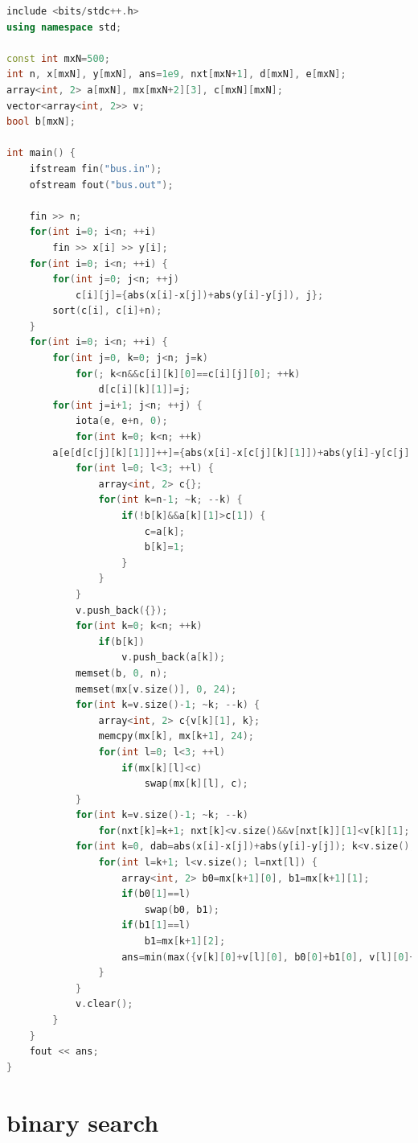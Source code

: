\documentclass[12pt,twiside,a4paper]{ctexbook}
\numberwithin{chapter}{part}
\begin{document}
\begin{lstlisting}[language=c++,breaklines=true] 
include <bits/stdc++.h>
using namespace std;

const int mxN=500;
int n, x[mxN], y[mxN], ans=1e9, nxt[mxN+1], d[mxN], e[mxN];
array<int, 2> a[mxN], mx[mxN+2][3], c[mxN][mxN];
vector<array<int, 2>> v;
bool b[mxN];

int main() {
    ifstream fin("bus.in");
    ofstream fout("bus.out");

    fin >> n;
    for(int i=0; i<n; ++i)
        fin >> x[i] >> y[i];
    for(int i=0; i<n; ++i) {
        for(int j=0; j<n; ++j)
            c[i][j]={abs(x[i]-x[j])+abs(y[i]-y[j]), j};
        sort(c[i], c[i]+n);
    }
    for(int i=0; i<n; ++i) {
        for(int j=0, k=0; j<n; j=k)
            for(; k<n&&c[i][k][0]==c[i][j][0]; ++k)
                d[c[i][k][1]]=j;
        for(int j=i+1; j<n; ++j) {
            iota(e, e+n, 0);
            for(int k=0; k<n; ++k)
		a[e[d[c[j][k][1]]]++]={abs(x[i]-x[c[j][k][1]])+abs(y[i]-y[c[j][k][1]]), c[j][k][0]};
            for(int l=0; l<3; ++l) {
                array<int, 2> c{};
                for(int k=n-1; ~k; --k) {
                    if(!b[k]&&a[k][1]>c[1]) {
                        c=a[k];
                        b[k]=1;
                    }
                }
            }
            v.push_back({});
            for(int k=0; k<n; ++k)
                if(b[k])
                    v.push_back(a[k]);
            memset(b, 0, n);
            memset(mx[v.size()], 0, 24);
            for(int k=v.size()-1; ~k; --k) {
                array<int, 2> c{v[k][1], k};
                memcpy(mx[k], mx[k+1], 24);
                for(int l=0; l<3; ++l)
                    if(mx[k][l]<c)
                        swap(mx[k][l], c);
            }
            for(int k=v.size()-1; ~k; --k)
                for(nxt[k]=k+1; nxt[k]<v.size()&&v[nxt[k]][1]<v[k][1]; nxt[k]=nxt[nxt[k]]);
            for(int k=0, dab=abs(x[i]-x[j])+abs(y[i]-y[j]); k<v.size(); ++k) {
                for(int l=k+1; l<v.size(); l=nxt[l]) {
                    array<int, 2> b0=mx[k+1][0], b1=mx[k+1][1];
                    if(b0[1]==l)
                        swap(b0, b1);
                    if(b1[1]==l)
                        b1=mx[k+1][2];
                    ans=min(max({v[k][0]+v[l][0], b0[0]+b1[0], v[l][0]+dab+b0[0]}), ans);
                }
            }
            v.clear();
        }
    }
    fout << ans;
}
\end{lstlisting}

\chapter{binary search}
\end{document}
